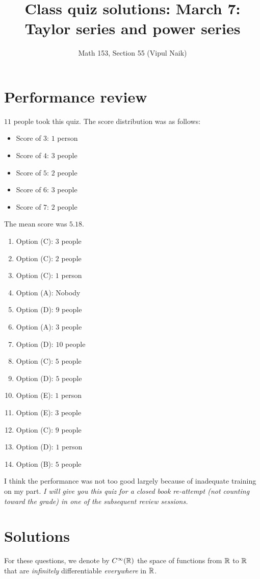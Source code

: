 \documentclass[10pt]{amsart}
\title{Class quiz solutions: March 7: Taylor series and power series}
\author{Math 153, Section 55 (Vipul Naik)}
\begin{document}
\maketitle

\section{Performance review}

$11$ people took this quiz. The score distribution was as follows:

\begin{itemize}
\item Score of $3$: $1$ person
\item Score of $4$: $3$ people
\item Score of $5$: $2$ people
\item Score of $6$: $3$ people
\item Score of $7$: $2$ people
\end{itemize}

The mean score was $5.18$.

\begin{enumerate}
\item Option (C): $3$ people 
\item Option (C): $2$ people
\item Option (C): $1$ person
\item Option (A): Nobody
\item Option (D): $9$ people
\item Option (A): $3$ people
\item Option (D): $10$ people
\item Option (C): $5$ people
\item Option (D): $5$ people
\item Option (E): $1$ person
\item Option (E): $3$ people
\item Option (C): $9$ people
\item Option (D): $1$ person
\item Option (B): $5$ people
\end{enumerate}

I think the performance was not too good largely because of inadequate
training on my part. {\em I will give you this quiz for a closed book
re-attempt (not counting toward the grade) in one of the subsequent
review sessions.}

\section{Solutions}
For these questions, we denote by $C^\infty(\mathbb{R})$ the space of
functions from $\mathbb{R}$ to $\mathbb{R}$ that are {\em infinitely} differentiable
{\em everywhere} in $\mathbb{R}$.
\end{document}
